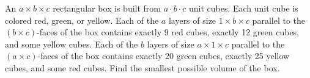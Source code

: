 An $a\times b\times c$ rectangular box is built from $a\cdot b \cdot c$ unit cubes. Each unit cube is colored red, green, or yellow. Each of the $a$ layers of size $1\times b \times c$ parallel to the $(b\times c)$-faces of the box contains exactly $9$ red cubes, exactly 12 green cubes, and some yellow cubes. Each of the $b$ layers of size $a\times 1 \times c$ parallel to the $(a\times c)$-faces of the box contains exactly 20 green cubes, exactly 25 yellow cubes, and some red cubes. Find the smallest possible volume of the box.